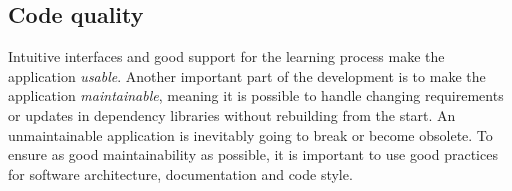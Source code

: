 \subsection{Code quality}

Intuitive interfaces and good support for the learning process make the application \textit{usable}. Another important part of the development is to make the application \textit{maintainable}, meaning it is possible to handle changing requirements or updates in dependency libraries without rebuilding from the start. An unmaintainable application is inevitably going to break or become obsolete. To ensure as good maintainability as possible, it is important to use good practices for software architecture, documentation and code style.
